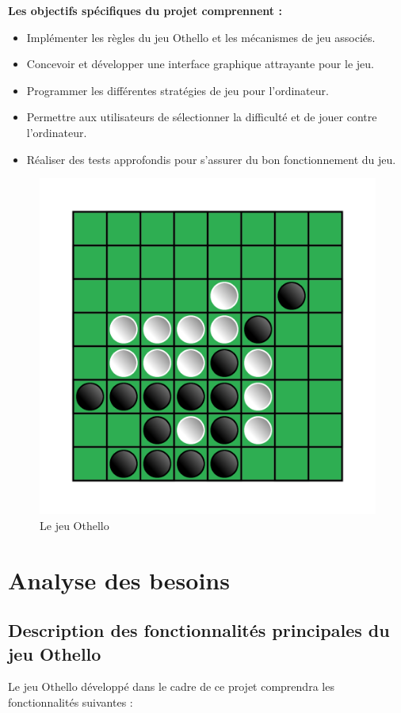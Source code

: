 \documentclass[12pt]{article}
\begin{document}
\textbf{Les objectifs spécifiques du projet comprennent :}

\begin{itemize}
	\item Implémenter les règles du jeu Othello et les mécanismes de jeu associés.
	\item Concevoir et développer une interface graphique attrayante pour le jeu.
	\item Programmer les différentes stratégies de jeu pour l'ordinateur.
	\item Permettre aux utilisateurs de sélectionner la difficulté et de jouer contre l'ordinateur.
	\item Réaliser des tests approfondis pour s'assurer du bon fonctionnement du jeu.
\end{itemize}

\begin{figure}[H]
	\centering
	\includegraphics[scale=0.2]{img/othello}
	\caption{Le jeu Othello}
	\label{othello figure}
\end{figure}
\newpage
	\section{Analyse des besoins}	
	\subsection{Description des fonctionnalités principales du jeu Othello}
Le jeu Othello développé dans le cadre de ce projet comprendra les fonctionnalités suivantes :
\end{document}
